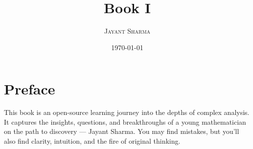 \documentclass[10pt, oneside]{book}
\title{\Huge \textbf{Book I}}
\author{\textsc{Jayant Sharma}}
\date{\today}
\theoremstyle{definition}
\theoremstyle{plain}
\begin{document}
\maketitle
\tableofcontents

\chapter*{Preface}
This book is an open-source learning journey into the depths of complex analysis. It captures the insights, questions, and breakthroughs of a young mathematician on the path to discovery — Jayant Sharma. You may find mistakes, but you'll also find clarity, intuition, and the fire of original thinking.


\end{document}

